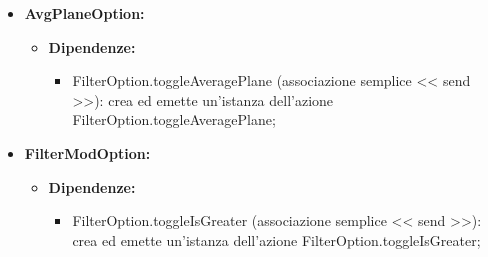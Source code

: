 \begin{itemize}
    \item \textbf{AvgPlaneOption:}
    \begin{itemize}
        \item \textbf{Dipendenze:}
        \begin{itemize}
            \item FilterOption.toggleAveragePlane (associazione semplice << send >>): crea ed emette un’istanza dell’azione FilterOption.toggleAveragePlane;
        \end{itemize} 
    \end{itemize}

    \item \textbf{FilterModOption:}
    \begin{itemize}
        \item \textbf{Dipendenze:}
        \begin{itemize}
            \item FilterOption.toggleIsGreater (associazione semplice << send >>): crea ed emette un’istanza dell’azione FilterOption.toggleIsGreater;
        \end{itemize} 
    \end{itemize}
\end{itemize}

